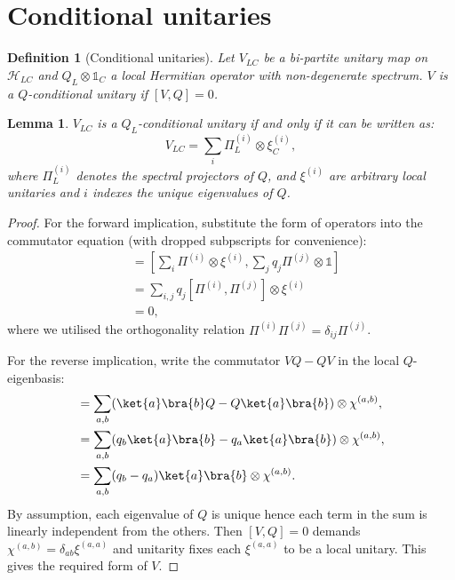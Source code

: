 \documentclass[11pt, twocolumn, floatfix, superscriptaddress, aps, prb, raggedbottom]{revtex4-2}
\newtheorem{lemma}[theorem]{Lemma}
\newtheorem{definition}{Definition}[section]
\newcommand{\Id}{\mathds{1}}
\begin{document}
\section{Conditional unitaries \label{app:conditionals}}

\begin{definition}[Conditional unitaries]
    Let $V_{LC}$ be a bi-partite unitary map on $\mathcal{H}_{LC}$ and $Q_{L} \otimes \Id_C$ a local Hermitian operator with non-degenerate spectrum. $V$ is a $Q$-conditional unitary if $[V,Q] = 0$.
\end{definition}
\begin{lemma}
     $V_{LC}$ is a $Q_L$-conditional unitary if and only if it can be written as:
    \begin{equation}
        V_{LC} = \sum_{i} \Pi^{(i)}_L \otimes \xi^{(i)}_C,
    \end{equation}
    \noindent where $\Pi^{(i)}_L$ denotes the spectral projectors of $Q$, and $\xi^{(i)}$ are arbitrary local unitaries and $i$ indexes the unique eigenvalues of $Q$.
\end{lemma}
\begin{proof}
For the forward implication, substitute the form of operators into the commutator equation (with dropped subpscripts for convenience):
\begin{align}
        [V, Q] &= \left [  \sum_i \Pi^{(i)} \otimes \xi^{(i)}, \sum_j q_j\Pi^{(j) }  \otimes \Id\right] \\
            &= \sum_{i,j} q_j [\Pi^{(i)}, \Pi^{(j)}] \otimes \xi^{(i)} \\
            &= 0,
\end{align}
\noindent where we utilised the orthogonality relation $\Pi^{(i)}\Pi^{(j)} = \delta_{ij}\Pi^{(j)}$.

For the reverse implication, write the commutator $VQ - QV$ in the local $Q$-eigenbasis: 
\begin{align}
    [V,Q]  &=\sum_{a,b} (\ket{a}\bra{b}Q - Q\ket{a} \bra{b}) \otimes \chi^{(a,b)}, \\ 
    &= \sum_{a,b} (q_b \ket{a}\bra{b}-  q_{a}\ket{a} \bra{b}) \otimes \chi^{(a,b)}, \\
    &= \sum_{a,b} (q_b-q_a)\ket{a}\bra{b}\otimes \chi^{(a,b)}.
\end{align}
\noindent By assumption, each eigenvalue of $Q$ is unique hence each term in the sum is linearly independent from the others. Then $[V,Q]= 0$ demands $\chi^{(a,b)} = \delta_{ab} \xi^{(a,a)}$ and unitarity fixes each $\xi^{(a,a)}$ to be a local unitary. This gives the required form of $V$.
\end{proof}
\end{document}
